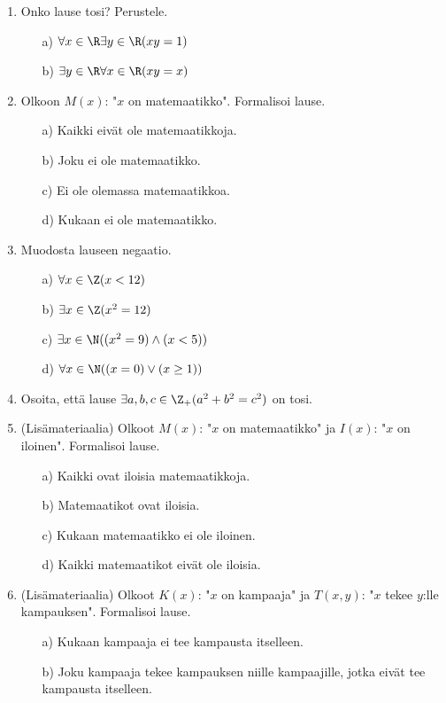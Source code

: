 \begin{enumerate}
\item Onko lause tosi? Perustele.
\begin{itemize}
\item[a)] $\forall x\in \R\exists y\in \R (xy=1)$
\item[b)] $\exists y\in \R\forall x\in \R (xy =x)$
\end{itemize}

\item Olkoon $M(x)$: "$x$ on matemaatikko". Formalisoi lause.

\begin{itemize}
\item[a)] Kaikki eivät ole matemaatikkoja.
\item[b)] Joku ei ole matemaatikko.
\item[c)] Ei ole olemassa matemaatikkoa.
\item[d)] Kukaan ei ole matemaatikko.
\end{itemize}

\item
Muodosta lauseen negaatio.
\begin{itemize}
\item[a)] $\forall x\in \Z (x < 12)$
\item[b)] $\exists x\in \Z (x^2 = 12)$
\item[c)] $\exists x\in \N ((x^2=9) \land (x<5))$
\item[d)] $\forall x\in \N ((x=0)\lor (x\ge 1))$
\end{itemize}

\item Osoita, että lause $\exists a,b,c \in \Z_{+} (a^2 + b^2 =
c^2)$ on tosi.

\item (Lisämateriaalia) Olkoot $M(x)$: "$x$ on matemaatikko" ja
$I(x)$: "$x$ on iloinen". Formalisoi lause.
\begin{itemize}
\item[a)] Kaikki ovat iloisia matemaatikkoja.
\item[b)] Matemaatikot ovat iloisia.
\item[c)] Kukaan matemaatikko ei ole iloinen.
\item[d)] Kaikki matemaatikot eivät ole iloisia.
\end{itemize}

\item (Lisämateriaalia) Olkoot $K(x)$: "$x$ on kampaaja" ja
$T(x,y)$: "$x$ tekee $y$:lle kampauksen". Formalisoi lause.
\begin{itemize}
\item[a)] Kukaan kampaaja ei tee kampausta itselleen.
\item[b)] Joku kampaaja tekee kampauksen niille kampaajille,
jotka eivät tee kampausta itselleen.
\end{itemize}

\end{enumerate}

